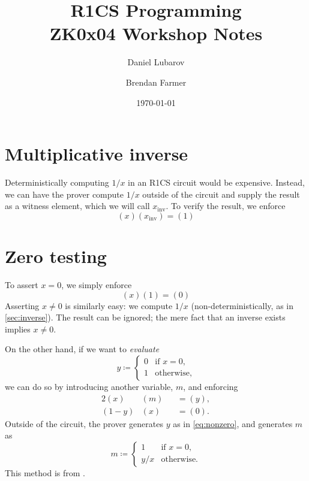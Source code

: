 \documentclass{article}
\title{R1CS Programming \\ \large ZK0x04 Workshop Notes}
\author{Daniel Lubarov \and Brendan Farmer}
\date{\today}
\begin{document}
\maketitle

{\hypersetup{hidelinks} \tableofcontents}
\newpage


\section{Multiplicative inverse} \label{sec:inverse}

Deterministically computing $1 / x$ in an R1CS circuit would be expensive. Instead, we can have the prover compute $1 / x$ outside of the circuit and supply the result as a witness element, which we will call $x_\mathrm{inv}$. To verify the result, we enforce
\begin{equation}
  (x) (x_\mathrm{inv}) = (1)
\end{equation}


\section{Zero testing}

To assert $x = 0$, we simply enforce
\begin{equation}
  (x) (1) = (0)
\end{equation}
Asserting $x \ne 0$ is similarly easy: we compute $1 / x$ (non-deterministically, as in \autoref{sec:inverse}). The result can be ignored; the mere fact that an inverse exists implies $x \ne 0$.

On the other hand, if we want to \textit{evaluate}
\begin{equation} \label{eq:nonzero}
  y \coloneqq
  \begin{cases}
    0 & \text{if $x = 0$,} \\
    1 & \text{otherwise,}
  \end{cases}
\end{equation}
we can do so by introducing another variable, $m$, and enforcing
\begin{alignat}{2}
  (x)     & (m) &&= (y), \\
  (1 - y) & (x) &&= (0).
\end{alignat}
Outside of the circuit, the prover generates $y$ as in \autoref{eq:nonzero}, and generates $m$ as
\begin{equation}
  m \coloneqq
  \begin{cases}
    1 & \text{if $x = 0$,} \\
    y / x & \text{otherwise.}
  \end{cases}
\end{equation}
This method is from \cite{parno2013pinocchio}.
\end{document}
